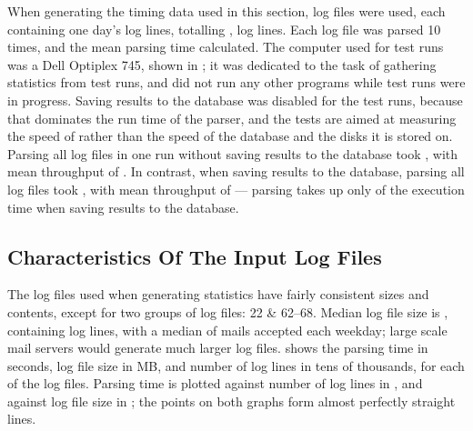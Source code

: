 When generating the timing data used in this section, \numberOFlogFILES{}
log files were used, each containing one day's log lines, totalling
, \numberOFlogLINEShuman{}
log lines.  Each log file was parsed 10 times, and the mean parsing time
calculated.  The computer used for test runs was a Dell Optiplex 745, shown
in ; it was
dedicated to the task of gathering statistics from test runs, and did not
run any other programs while test runs were in progress.  Saving results to
the database was disabled for the test runs, because that dominates the run
time of the parser, and the tests are aimed at measuring the speed of
\parsername{} rather than the speed of the database and the disks it is
stored on.  Parsing all \numberOFlogFILES{} log files in one run without
saving results to the database took
, with mean throughput of
.  In contrast, when saving
results to the database, parsing all \numberOFlogFILES{} log files took
, with mean throughput of
 --- parsing takes up only
 of the
execution time when saving results to the database.

\subsection{Characteristics Of The Input Log Files}

The \numberOFlogFILES{} log files used when generating statistics have
fairly consistent sizes and contents, except for two groups of log files:
22 \& 62--68.  Median log file size is
, containing
 log lines, with a median
of  mails accepted
each weekday; large scale mail servers would generate much larger log
files.   shows the parsing time in seconds, log file size in MB, and number
of log lines in tens of thousands, for each of the \numberOFlogFILES{} log
files.  Parsing time is plotted against number of log lines in
, and against
log file size in ;
the points on both graphs form almost perfectly straight lines.

